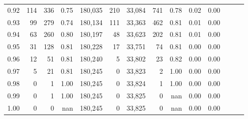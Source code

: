\begin{tabular}{rrrrrrrrrrrrrr}
0.92 &    114 &  336 &  0.75 &  180,035 &      210 &  33,084 &     741 &  0.78 &  0.02 &      0.00 \\
0.93 &     99 &  279 &  0.74 &  180,134 &      111 &  33,363 &     462 &  0.81 &  0.01 &      0.00 \\
0.94 &     63 &  260 &  0.80 &  180,197 &       48 &  33,623 &     202 &  0.81 &  0.01 &      0.00 \\
0.95 &     31 &  128 &  0.81 &  180,228 &       17 &  33,751 &      74 &  0.81 &  0.00 &      0.00 \\
0.96 &     12 &   51 &  0.81 &  180,240 &        5 &  33,802 &      23 &  0.82 &  0.00 &      0.00 \\
0.97 &      5 &   21 &  0.81 &  180,245 &        0 &  33,823 &       2 &  1.00 &  0.00 &      0.00 \\
0.98 &      0 &    1 &  1.00 &  180,245 &        0 &  33,824 &       1 &  1.00 &  0.00 &      0.00 \\
0.99 &      0 &    1 &  1.00 &  180,245 &        0 &  33,825 &       0 &   nan &  0.00 &      0.00 \\
1.00 &      0 &    0 &   nan &  180,245 &        0 &  33,825 &       0 &   nan &  0.00 &      0.00 \\
\bottomrule
\end{tabular}
